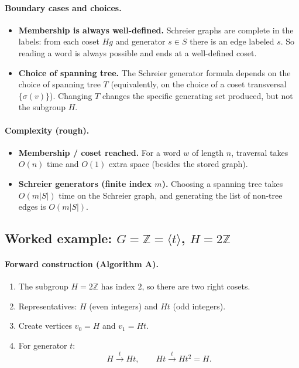 \documentclass[11pt]{article}
\theoremstyle{definition}
\theoremstyle{plain}
\theoremstyle{remark}
\begin{document}
\paragraph{Boundary cases and choices.}
\begin{itemize}[leftmargin=2em]
\item \textbf{Membership is always well-defined.} Schreier graphs are complete in the labels: from each coset $Hg$ and generator $s\in S$ there is an edge labeled $s$.
So reading a word is always possible and ends at a well-defined coset.
\item \textbf{Choice of spanning tree.} The Schreier generator formula depends on the choice of spanning tree $T$ (equivalently, on the choice of a coset transversal $\{\sigma(v)\}$).
Changing $T$ changes the specific generating set produced, but not the subgroup $H$.
\end{itemize}

\paragraph{Complexity (rough).}\cite{schreier1927,serre1980trees,cormen2009}
\begin{itemize}[leftmargin=2em]
\item \textbf{Membership / coset reached.} For a word $w$ of length $n$, traversal takes $O(n)$ time and $O(1)$ extra space (besides the stored graph).
\item \textbf{Schreier generators (finite index $m$).} Choosing a spanning tree takes $O(m|S|)$ time on the Schreier graph, and generating the list of non-tree edges is $O(m|S|)$.
\end{itemize}
\subsection*{Worked example: $G=\mathbb Z=\langle t\rangle$, $H=2\mathbb Z$}
\paragraph{Forward construction (Algorithm A).}
\begin{enumerate}[leftmargin=2.2em]
\item The subgroup $H=2\mathbb Z$ has index $2$, so there are two right cosets.
\item Representatives: $H$ (even integers) and $Ht$ (odd integers).
\item Create vertices $v_0=H$ and $v_1=Ht$.
\item For generator $t$:
\[
H\xrightarrow{t}Ht,\qquad Ht\xrightarrow{t}Ht^2=H.
\]
\end{enumerate}
\end{document}
